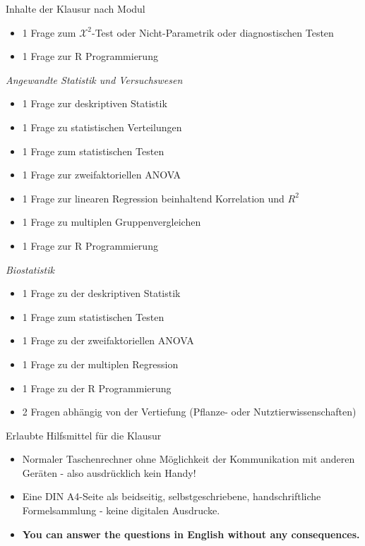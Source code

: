 \documentclass[a4paper, 10pt]{scrartcl}\usepackage[]{graphicx}\usepackage[]{xcolor}
\begin{document}
\begin{graybox}{Inhalte der Klausur nach Modul}
\begin{itemize}
  \item 1 Frage zum $\mathcal{X}^2$-Test oder Nicht-Parametrik oder diagnostischen Testen
  \item 1 Frage zur R Programmierung
  \end{itemize} 
  \textit{Angewandte Statistik und Versuchswesen} 
  \begin{itemize}
  \item 1 Frage zur deskriptiven Statistik
  \item 1 Frage zu statistischen Verteilungen
  \item 1 Frage zum statistischen Testen
  \item 1 Frage zur zweifaktoriellen ANOVA
  \item 1 Frage zur linearen Regression beinhaltend Korrelation und $R^2$
  \item 1 Frage zu multiplen Gruppenvergleichen
  \item 1 Frage zur R Programmierung
  \end{itemize} 
  \textit{Biostatistik}
  \begin{itemize}
  \item 1 Frage zu der deskriptiven Statistik
  \item 1 Frage zum statistischen Testen
  \item 1 Frage zu der zweifaktoriellen ANOVA
  \item 1 Frage zu der multiplen Regression
  \item 1 Frage zu der R Programmierung
  \item 2 Fragen abh{\"a}ngig von der Vertiefung (Pflanze- oder Nutztierwissenschaften)
  \end{itemize} 
\end{graybox}
  

\begin{graybox}{Erlaubte Hilfsmittel f{\"u}r die Klausur}
  \vspace{1Ex}
  \begin{itemize}
  \item Normaler Taschenrechner ohne M{\"o}glichkeit der Kommunikation mit anderen
    Ger{\"a}ten - also ausdr{\"u}cklich kein Handy!
  \item Eine DIN A4-Seite als beidseitig, selbstgeschriebene,
    handschriftliche Formelsammlung - keine digitalen Ausdrucke. 
  \item \textbf{You can answer the questions in English without any consequences.}  
  \end{itemize}
\end{graybox}
\vfill
\end{document}
